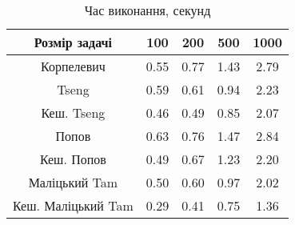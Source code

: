 \begin{table}[H]
	\centering
	\begin{tabular}{|c||c|c|c|c|}\hline
		Розмір задачі & 100 & 200 & 500 & 1000 \\ \hline \hline
		Корпелевич & 0.55 & 0.77 & 1.43 & 2.79 \\ \hline
		Tseng & 0.59 & 0.61 & 0.94 & 2.23 \\ \hline
		Кеш. Tseng & 0.46 & 0.49 & 0.85 & 2.07 \\ \hline
		Попов & 0.63 & 0.76 & 1.47 & 2.84 \\ \hline
		Кеш. Попов & 0.49 & 0.67 & 1.23 & 2.20 \\ \hline
		Маліцький Tam & 0.50 & 0.60 & 0.97 & 2.02 \\ \hline
		Кеш. Маліцький Tam & 0.29 & 0.41 & 0.75 & 1.36 \\ \hline
	\end{tabular}
	\caption{Час виконання, секунд}
\end{table}
